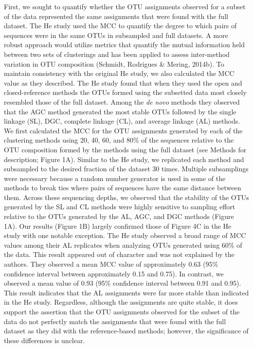 \documentclass[11pt,]{article}
\begin{document}
First, we sought to quantify whether the OTU assignments observed for a
subset of the data represented the same assignments that were found with
the full dataset. The He study used the MCC to quantify the degree to
which pairs of sequences were in the same OTUs in subsampled and full
datasets. A more robust approach would utilize metrics that quantify the
mutual information held between two sets of clusterings and has been
applied to assess inter-method variation in OTU composition (Schmidt,
Rodrigues \& Mering, 2014b). To maintain consistency with the original
He study, we also calculated the MCC value as they described. The He
study found that when they used the open and closed-reference methods
the OTUs formed using the subsetted data most closely resembled those of
the full dataset. Among the \emph{de novo} methods they observed that
the AGC method generated the most stable OTUs followed by the single
linkage (SL), DGC, complete linkage (CL), and average linkage (AL)
methods. We first calculated the MCC for the OTU assignments generated
by each of the clustering methods using 20, 40, 60, and 80\% of the
sequences relative to the OTU composition formed by the methods using
the full dataset (see Methods for description; Figure 1A). Similar to
the He study, we replicated each method and subsampled to the desired
fraction of the dataset 30 times. Multiple subsamplings were necessary
because a random number generator is used in some of the methods to
break ties where pairs of sequences have the same distance between them.
Across these sequencing depths, we observed that the stability of the
OTUs generated by the SL and CL methods were highly sensitive to
sampling effort relative to the OTUs generated by the AL, AGC, and DGC
methods (Figure 1A). Our results (Figure 1B) largely confirmed those of
Figure 4C in the He study with one notable exception. The He study
observed a broad range of MCC values among their AL replicates when
analyzing OTUs generated using 60\% of the data. This result appeared
out of character and was not explained by the authors. They observed a
mean MCC value of approximately 0.63 (95\% confidence interval between
approximately 0.15 and 0.75). In contrast, we observed a mean value of
0.93 (95\% confidence interval between 0.91 and 0.95). This result
indicates that the AL assignments were far more stable than indicated in
the He study. Regardless, although the assignments are quite stable, it
does support the assertion that the OTU assignments observed for the
subset of the data do not perfectly match the assignments that were
found with the full dataset as they did with the reference-based
methods; however, the significance of these differences is unclear.
\end{document}
